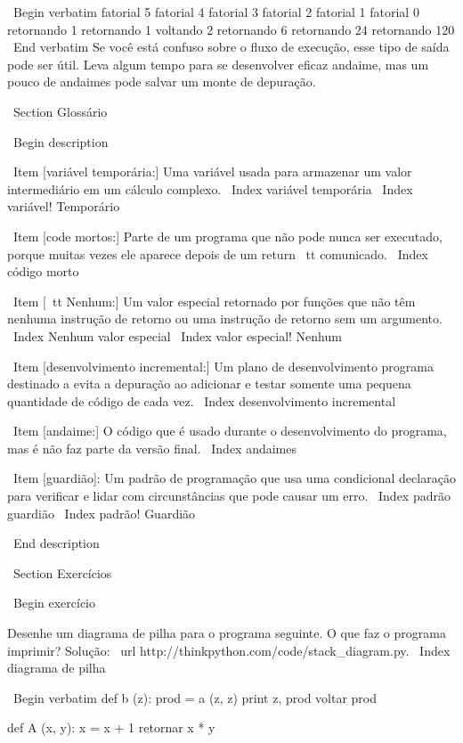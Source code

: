 \documentclass[10pt]{book}
\begin{document}
\begin {itemize}
{{{{\ Begin {verbatim}
                     fatorial 5
                 fatorial 4
             fatorial 3
         fatorial 2
     fatorial 1
 fatorial 0
 retornando 1
     retornando 1
         voltando 2
             retornando 6
                 retornando 24
                     retornando 120
\ End {verbatim}
%
Se você está confuso sobre o fluxo de execução, esse tipo de
saída pode ser útil. Leva algum tempo para se desenvolver eficaz
andaime, mas um pouco de andaimes pode salvar um monte de depuração.


\ Section {} Glossário

\ Begin {description}

\ Item [variável temporária:] Uma variável usada para armazenar um valor intermediário em
um cálculo complexo.
\ Index {variável temporária}
\ Index {variável! Temporário}

\ Item [code mortos:] Parte de um programa que não pode nunca ser executado, porque muitas vezes
ele aparece depois de um {return \ tt} comunicado.
\ Index {código morto}

\ Item [{\ tt Nenhum}:] Um valor especial retornado por funções que
não têm nenhuma instrução de retorno ou uma instrução de retorno sem um argumento.
\ Index {Nenhum valor especial}
\ Index {valor especial! Nenhum}

\ Item [desenvolvimento incremental:] Um plano de desenvolvimento programa destinado a
evita a depuração ao adicionar e testar somente
uma pequena quantidade de código de cada vez.
\ Index {desenvolvimento incremental}

\ Item [andaime:] O código que é usado durante o desenvolvimento do programa, mas é
não faz parte da versão final.
\ Index {} andaimes

\ Item [guardião]: Um padrão de programação que usa uma condicional
declaração para verificar e lidar com circunstâncias que
pode causar um erro.
\ Index {padrão guardião}
\ Index {padrão! Guardião}

\ End {description}


\ Section {Exercícios}

\ Begin {} exercício

Desenhe um diagrama de pilha para o programa seguinte. O que faz o programa imprimir?
Solução: \ url {http://thinkpython.com/code/stack_diagram.py}.
\ Index {diagrama de pilha}

\ Begin {verbatim}
def b (z):
    prod = a (z, z)
    print z, prod
    voltar prod

def A (x, y):
    x = x + 1
    retornar x * y

}}}}
\end{itemize}
\end{document}
